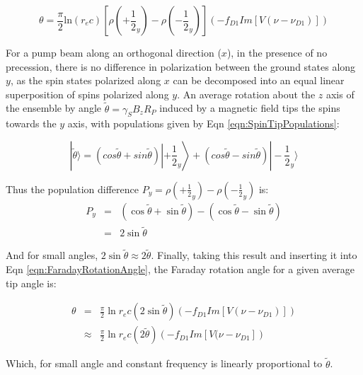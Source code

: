 \documentclass[PaulGanssle-Thesis.tex]{subfiles}
\begin{document}
\begin{equation}
\label{eqn:FaradayRotationAngle}
\theta = \frac{\pi}{2}\mathrm{ln}(r_ec)\left[\rho\left(+\frac{1}{2}_{y}\right)-\rho\left(-\frac{1}{2}_y\right)\right]\left(-f_{D1}Im[V(\nu-\nu_{D1})]\right)
\end{equation}

For a pump beam along an orthogonal direction ($x$), in the presence of no precession, there is no difference in polarization between the ground states along $y$, as the spin states polarized along $x$ can be decomposed into an equal linear superposition of spins polarized along $y$. An average rotation about the $z$ axis of the ensemble by angle $\tilde{\theta} = \gamma_{S}B_{z}R_{P}$ induced by a magnetic field tips the spins towards the $y$ axis, with populations given by Eqn \ref{eqn:SpinTipPopulations}:

\begin{equation}
\label{eqn:SpinTipPopulations}
|\tilde{\theta}\rangle = \left(cos\tilde{\theta} + sin\tilde{\theta}\right)\left|+\frac{1}{2}_{y}\right\rangle + \left(cos\tilde{\theta} - sin\tilde{\theta}\right)|-\frac{1}{2}_{y}\rangle
\end{equation}

Thus the population difference $P_y = \rho(+\frac{1}{2}_{y}) - \rho(-\frac{1}{2}_{y})$ is:
\begin{align}
\label{eqn:PopulationDifferenceSpinsTipped}
P_y & = & (\cos\tilde{\theta} + \sin\tilde{\theta}) - (\cos\tilde{\theta} - \sin\tilde{\theta}) \\
& = & 2\sin\tilde{\theta}
\end{align}

And for small angles, $2 \sin\tilde{\theta} \approx 2\tilde{\theta}$. Finally, taking this result and inserting it into Eqn \ref{eqn:FaradayRotationAngle}, the Faraday rotation angle for a given average tip angle is:

\begin{align}
\label{eqn:RotationFromTip}
\theta & = & \frac{\pi}{2}\ln{r_ec}(2\sin\tilde{\theta})\left(-f_{D1}Im[V(\nu-\nu_{D1})]\right) \\
& \approx & \frac{\pi}{2}\ln{r_ec}(2\tilde{\theta})\left(-f_{D1}Im[V(\nu-\nu_{D1}]\right)
\end{align}

Which, for small angle and constant frequency is linearly proportional to $\tilde{\theta}$.
\end{document}
